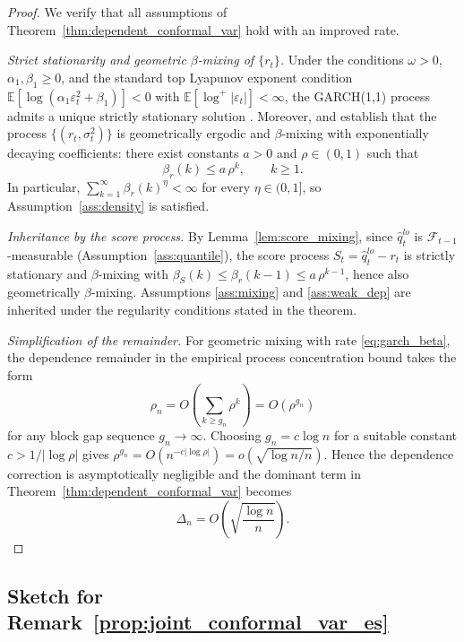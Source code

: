 \documentclass[preprint,11pt,authoryear]{elsarticle}
\newcommand{\1}{\boldsymbol{1}}
\begin{document}
	\begin{proof}
		We verify that all assumptions of Theorem~\ref{thm:dependent_conformal_var} hold with an improved rate.
		
		\textit{Strict stationarity and geometric $\beta$-mixing of $\{r_t\}$.}\enspace
		Under the conditions $\omega>0$, $\alpha_1,\beta_1\ge 0$, and the standard top Lyapunov exponent condition $\mathbb E[\log(\alpha_1\varepsilon_t^2+\beta_1)]<0$ with $\mathbb E[\log^+|\varepsilon_t|]<\infty$, the GARCH(1,1) process admits a unique strictly stationary solution \citep[Theorem~2.10]{francq2019garch}. Moreover, \citet[Theorem~3.2]{francq2019garch} and \citet{lindner2009stationarity} establish that the process $\{(r_t,\sigma_t^2)\}$ is geometrically ergodic and $\beta$-mixing with exponentially decaying coefficients: there exist constants $a>0$ and $\rho\in(0,1)$ such that
		\begin{equation}\label{eq:garch_beta}
			\beta_r(k) \le a\,\rho^k, \qquad k\ge 1.
		\end{equation}
		In particular, $\sum_{k=1}^\infty \beta_r(k)^\eta < \infty$ for every $\eta\in(0,1]$, so Assumption~\ref{ass:density} is satisfied.
		
		\textit{Inheritance by the score process.}\enspace
		By Lemma~\ref{lem:score_mixing}, since $\hat q_t^{lo}$ is $\mathcal F_{t-1}$-measurable (Assumption~\ref{ass:quantile}), the score process $S_t = \hat q_t^{lo}-r_t$ is strictly stationary and $\beta$-mixing with $\beta_S(k) \le \beta_r(k-1)\le a\,\rho^{k-1}$, hence also geometrically $\beta$-mixing. Assumptions \ref{ass:mixing} and \ref{ass:weak_dep} are inherited under the regularity conditions stated in the theorem.
		
		\textit{Simplification of the remainder.}\enspace
		For geometric mixing with rate \eqref{eq:garch_beta}, the dependence remainder in the empirical process concentration bound takes the form
		\[
		\rho_n = O\!\left(\sum_{k\ge g_n}\rho^k\right) = O(\rho^{g_n})
		\]
		for any block gap sequence $g_n \to \infty$. Choosing $g_n = c\log n$ for a suitable constant $c > 1/|\log \rho|$ gives $\rho^{g_n} = O(n^{-c|\log\rho|}) = o(\sqrt{\log n / n})$. Hence the dependence correction is asymptotically negligible and the dominant term in Theorem~\ref{thm:dependent_conformal_var} becomes
		\[
		\Delta_n = O\!\left(\sqrt{\frac{\log n}{n}}\right).
		\]
	\end{proof}
	
	\subsection{Sketch for Remark~\ref{prop:joint_conformal_var_es}}
	
\end{document}
